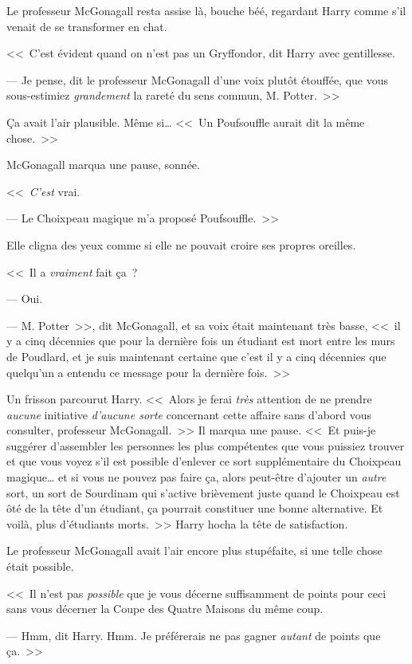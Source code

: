 Le professeur McGonagall resta assise là, bouche béé, regardant Harry comme s'il venait de se transformer en chat.

<<~C'est évident quand on n'est pas un Gryffondor, dit Harry avec gentillesse.

--- Je pense, dit le professeur McGonagall d'une voix plutôt étouffée, que vous sous-estimiez \emph{grandement} la rareté du sens commun, M. Potter.~>>

Ça avait l'air plausible. Même si… <<~Un Poufsouffle aurait dit la même chose.~>>

McGonagall marqua une pause, sonnée.

<<~\emph{C'est} vrai.

--- Le Choixpeau magique m'a proposé Poufsouffle.~>>

Elle cligna des yeux comme si elle ne pouvait croire ses propres oreilles.

<<~Il a \emph{vraiment} fait ça~?

--- Oui.

--- M. Potter~>>, dit McGonagall, et sa voix était maintenant très basse, <<~il y a cinq décennies que pour la dernière fois un étudiant est mort entre les murs de Poudlard, et je suis maintenant certaine que c'est il y a cinq décennies que quelqu'un a entendu ce message pour la dernière fois.~>>

Un frisson parcourut Harry. <<~Alors je ferai \emph{très} attention de ne prendre \emph{aucune} initiative \emph{d'aucune sorte} concernant cette affaire sans d'abord vous consulter, professeur McGonagall.~>> Il marqua une pause. <<~Et puis-je suggérer d'assembler les personnes les plus compétentes que vous puissiez trouver et que vous voyez s'il est possible d'enlever ce sort supplémentaire du Choixpeau magique… et si vous ne pouvez pas faire ça, alors peut-être d'ajouter un \emph{autre} sort, un sort de Sourdinam qui s'active brièvement juste quand le Choixpeau est ôté de la tête d'un étudiant, ça pourrait constituer une bonne alternative. Et voilà, plus d'étudiants morts.~>> Harry hocha la tête de satisfaction.

Le professeur McGonagall avait l'air encore plus stupéfaite, si une telle chose était possible.

<<~Il n'est pas \emph{possible} que je vous décerne suffisamment de points pour ceci sans vous décerner la Coupe des Quatre Maisons du même coup.

--- Hmm, dit Harry. Hmm. Je préférerais ne pas gagner \emph{autant} de points que ça.~>>

